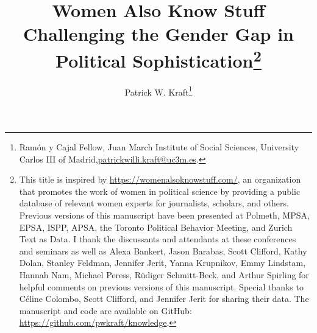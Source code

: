 \documentclass[12pt]{article}
\author{Patrick W. Kraft\footnote{Ramón y Cajal Fellow, Juan March Institute of Social Sciences,  University Carlos III of Madrid,\newline \href{mailto:patrickwilli.kraft@uc3m.es}{patrickwilli.kraft@uc3m.es}.}}
\title{Women Also Know Stuff \\
\large{Challenging the Gender Gap in Political Sophistication}\footnote{This title is inspired by \url{https://womenalsoknowstuff.com/}, an organization that promotes the work of women in political science by providing a public database of relevant women experts for journalists, scholars, and others. Previous versions of this manuscript have been presented at Polmeth, MPSA, EPSA, ISPP, APSA, the Toronto Political Behavior Meeting, and Zurich Text as Data. I thank the discussants and attendants at these conferences and seminars as well as Alexa Bankert, Jason Barabas, Scott Clifford, Kathy Dolan, Stanley Feldman, Jennifer Jerit, Yanna Krupnikov, Emmy Lindstam, Hannah Nam, Michael Peress, R\"udiger Schmitt-Beck, and Arthur Spirling for helpful comments on previous versions of this manuscript. Special thanks to C{\'e}line Colombo, Scott Clifford, and Jennifer Jerit for sharing their data. The manuscript and code are available on GitHub: \url{https://github.com/pwkraft/knowledge}.
}}
\date{}
\begin{document}
\doublespacing



%
\end{document}
